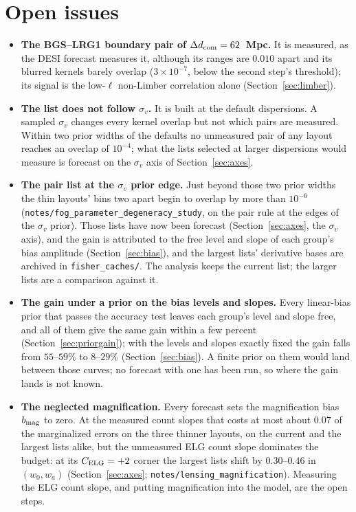 \documentclass[11pt]{article}
\newcommand{\dcom}{$\Delta d_{\rm com} = 62$~Mpc}
\newcommand{\sv}{\sigma_v}
\newcommand{\us}{\_\allowbreak}
\begin{document}
\section{Open issues}
\label{sec:open}

\begin{itemize}
  \item \textbf{The BGS--LRG1 boundary pair of \dcom{}.}  It is
    measured, as the DESI forecast measures it, although its ranges are
    $0.010$ apart and its blurred kernels barely overlap
    ($3 \times 10^{-7}$, below the second step's threshold); its signal
    is the low-$\ell$ non-Limber correlation alone
    (Section~\ref{sec:limber}).
  \item \textbf{The list does not follow $\sv$.}  It is built at the
    default dispersions.  A sampled $\sv$ changes every kernel overlap
    but not which pairs are measured.  Within two prior widths of the
    defaults no unmeasured pair of any layout reaches an overlap of
    $10^{-4}$; what the lists selected at larger dispersions would
    measure is forecast on the $\sv$ axis of Section~\ref{sec:axes}.
  \item \textbf{The pair list at the $\sv$ prior edge.}  Just beyond
    those two prior widths the thin layouts' bins two apart begin to
    overlap by more than $10^{-6}$
    (\texttt{notes/fog\us parameter\us degeneracy\us study}, on the
    pair rule at the edges of the $\sv$ prior).  Those lists have now
    been forecast (Section~\ref{sec:axes}, the $\sv$ axis), and the
    gain is attributed to the free level and slope of each group's
    bias amplitude (Section~\ref{sec:bias}), and the largest lists'
    derivative bases are archived in \texttt{fisher\us caches/}.
    The analysis keeps the current list; the larger lists are a
    comparison against it.
  \item \textbf{The gain under a prior on the bias levels and
    slopes.}  Every linear-bias prior that passes the accuracy test
    leaves each group's level and slope free, and all of them give
    the same gain within a few percent
    (Section~\ref{sec:priorgain}); with the levels and slopes
    exactly fixed the gain falls from $55$--$59\%$ to $8$--$29\%$
    (Section~\ref{sec:bias}).  A finite prior on them would land
    between those curves; no forecast with one has been run, so
    where the gain lands is not known.
  \item \textbf{The neglected magnification.}  Every forecast sets
    the magnification bias $b_{\rm mag}$ to zero.  At the measured
    count slopes that costs at most about $0.07$ of the marginalized
    errors on the three thinner layouts, on the current and the
    largest lists alike, but the unmeasured ELG count slope
    dominates the budget: at its $C_{\rm ELG} = +2$ corner the
    largest lists shift by $0.30$--$0.46$ in $(w_0, w_a)$
    (Section~\ref{sec:axes};
    \texttt{notes/lensing\us magnification}).  Measuring the ELG
    count slope, and putting magnification into the model, are the
    open steps.
\end{itemize}
\end{document}
